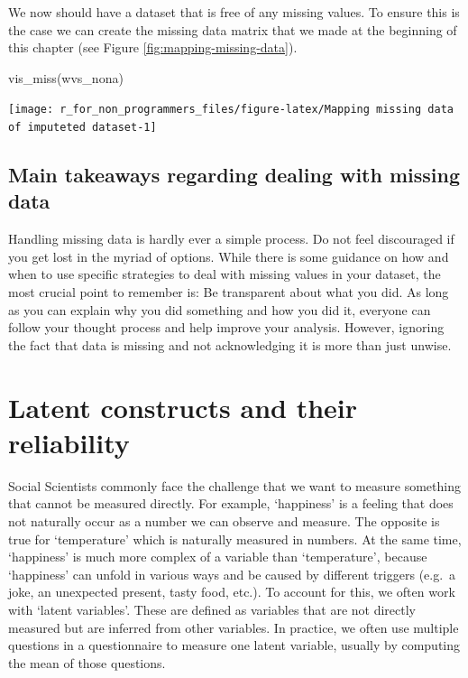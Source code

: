 \documentclass[
]{book}
\newenvironment{Shaded}{\begin{snugshade}}{\end{snugshade}}
\newcommand{\FunctionTok}[1]{\textcolor[rgb]{0.00,0.00,0.00}{#1}}
\newcommand{\NormalTok}[1]{#1}
\begin{document}
We now should have a dataset that is free of any missing values. To ensure this is the case we can create the missing data matrix that we made at the beginning of this chapter (see Figure \ref{fig:mapping-missing-data}).

\begin{Shaded}
\begin{Highlighting}[]
\FunctionTok{vis\_miss}\NormalTok{(wvs\_nona)}
\end{Highlighting}
\end{Shaded}

\begin{center}\texttt{[image: r\_for\_non\_programmers\_files/figure-latex/Mapping missing data of imputeted dataset-1]} \end{center}

\hypertarget{main-takeaways-regarding-dealing-with-missing-data}{%
\subsection{Main takeaways regarding dealing with missing data}\label{main-takeaways-regarding-dealing-with-missing-data}}

Handling missing data is hardly ever a simple process. Do not feel discouraged if you get lost in the myriad of options. While there is some guidance on how and when to use specific strategies to deal with missing values in your dataset, the most crucial point to remember is: Be transparent about what you did. As long as you can explain why you did something and how you did it, everyone can follow your thought process and help improve your analysis. However, ignoring the fact that data is missing and not acknowledging it is more than just unwise.

\hypertarget{latent-constructs}{%
\section{Latent constructs and their reliability}\label{latent-constructs}}

Social Scientists commonly face the challenge that we want to measure something that cannot be measured directly. For example, `happiness' is a feeling that does not naturally occur as a number we can observe and measure. The opposite is true for `temperature' which is naturally measured in numbers. At the same time, `happiness' is much more complex of a variable than `temperature', because `happiness' can unfold in various ways and be caused by different triggers (e.g.~a joke, an unexpected present, tasty food, etc.). To account for this, we often work with `latent variables'. These are defined as variables that are not directly measured but are inferred from other variables. In practice, we often use multiple questions in a questionnaire to measure one latent variable, usually by computing the mean of those questions.
\end{document}
